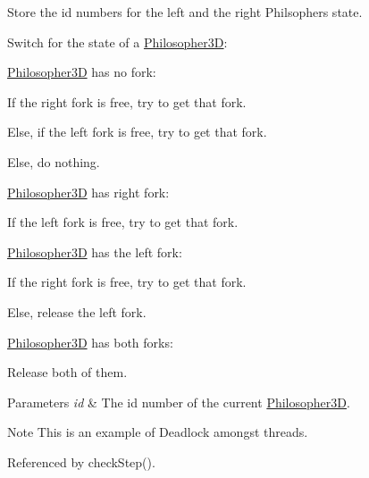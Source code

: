 \begin{DoxyItemize}
\item Store the id numbers for the left and the right Philsopher\textquotesingle{}s state.
\item Switch for the state of a \hyperlink{class_philosopher3_d}{Philosopher3D}\+:
\begin{DoxyItemize}
\item \hyperlink{class_philosopher3_d}{Philosopher3D} has no fork\+:
\begin{DoxyItemize}
\item If the right fork is free, try to get that fork.
\item Else, if the left fork is free, try to get that fork.
\item Else, do nothing.
\end{DoxyItemize}
\item \hyperlink{class_philosopher3_d}{Philosopher3D} has right fork\+:
\begin{DoxyItemize}
\item If the left fork is free, try to get that fork.
\end{DoxyItemize}
\item \hyperlink{class_philosopher3_d}{Philosopher3D} has the left fork\+:
\begin{DoxyItemize}
\item If the right fork is free, try to get that fork.
\item Else, release the left fork.
\end{DoxyItemize}
\item \hyperlink{class_philosopher3_d}{Philosopher3D} has both forks\+:
\begin{DoxyItemize}
\item Release both of them.
\end{DoxyItemize}
\end{DoxyItemize}
\end{DoxyItemize}
\begin{DoxyParams}{Parameters}
{\em id} & The id number of the current \hyperlink{class_philosopher3_d}{Philosopher3D}. \\
\hline
\end{DoxyParams}
\begin{DoxyNote}{Note}
This is an example of Deadlock amongst threads. 
\end{DoxyNote}


Referenced by check\+Step().

\mbox{\label{class_table3_d_a4fac6d05e99d37817b7f5e510d363e47}} 
